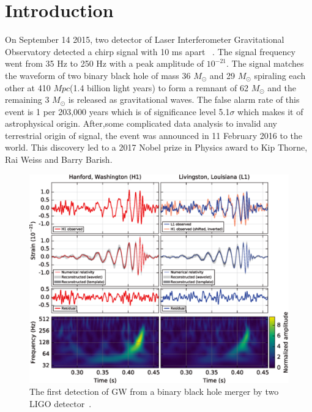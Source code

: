 \documentclass{ttuthes2007}
\begin{document}
\chapter{\textbf{Introduction}}
    On September 14 2015, two detector of Laser Interferometer Gravitational
Observatory detected a chirp signal with 10 ms apart ~\cite{Abbott_2016}. The
signal frequency went from 35 Hz to 250 Hz with a peak amplitude of $10^{-21}$.
The signal matches the waveform of two binary black hole of mass 36 $M_\odot$
and 29 $M_\odot$ spiraling each other at 410 $Mpc$(1.4 billion light years) to
form a remnant of 62 $M_\odot$ and the remaining 3 $M_\odot$ is released as
gravitational waves.  The false alarm rate of this event is 1 per 203,000 years
which is of significance level 5.1$\sigma$ which makes it of astrophysical
origin.  After,some complicated data analysis to invalid any terrestrial origin
of signal, the event was announced in 11 February 2016 to the world. This
discovery led to a 2017 Nobel prize in Physics award to Kip Thorne, Rai Weiss and
Barry Barish.
\begin{figure}[bht!]                                                              
        \includegraphics[width=\textwidth]{figure/BBH.png}                          
	\caption{The first detection of \ac{GW} from a binary black hole
merger by two \ac{LIGO} detector~\cite{Abbott_2016}.}
\end{figure}      
\end{document}
